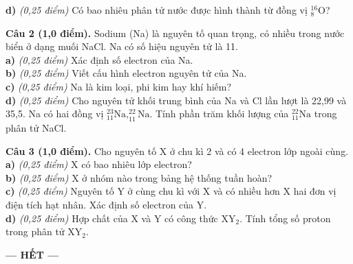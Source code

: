 \documentclass[13pt,a4paper]{article}
\begin{document}
\textbf{d)} \textit{(0,25 điểm)} Có bao nhiêu phân tử nước được hình thành từ đồng vị $^{16}_8\text{O}$?\\
\vspace{3.5cm}

\textbf{Câu 2 (1,0 điểm).} Sodium (Na) là nguyên tố quan trọng, có nhiều trong nước biển ở dạng muối NaCl. Na có số hiệu nguyên tử là 11.\\
\textbf{a)} \textit{(0,25 điểm)} Xác định số electron của Na.\\

\textbf{b)} \textit{(0,25 điểm)} Viết cấu hình electron nguyên tử của Na.\\

\textbf{c)} \textit{(0,25 điểm)} Na là kim loại, phi kim hay khí hiếm?\\

\textbf{d)} \textit{(0,25 điểm)} Cho nguyên tử khối trung bình của Na và Cl lần lượt là 22,99 và 35,5. Na có hai đồng vị $^{23}_{11}\text{Na}, ^{22}_{11}\text{Na}$. Tính phần trăm khối lượng của $^{22}_{11}\text{Na}$ trong phân tử NaCl.\\
\vspace{3.5cm}

\textbf{Câu 3 (1,0 điểm).} Cho nguyên tố X ở chu kì 2 và có 4 electron lớp ngoài cùng.\\
\textbf{a)} \textit{(0,25 điểm)} X có bao nhiêu lớp electron?\\

\textbf{b)} \textit{(0,25 điểm)} X ở nhóm nào trong bảng hệ thống tuần hoàn?\\

\textbf{c)} \textit{(0,25 điểm)} Nguyên tố Y ở cùng chu kì với X và có nhiều hơn X hai đơn vị điện tích hạt nhân. Xác định số electron của Y.\\

\textbf{d)} \textit{(0,25 điểm)} Hợp chất của X và Y có công thức $\text{XY}_2$. Tính tổng số proton trong phân tử $\text{XY}_2$.\\
\vspace{3.5cm}

\begin{center}
\textbf{--- HẾT ---}
\end{center}
\end{document}
